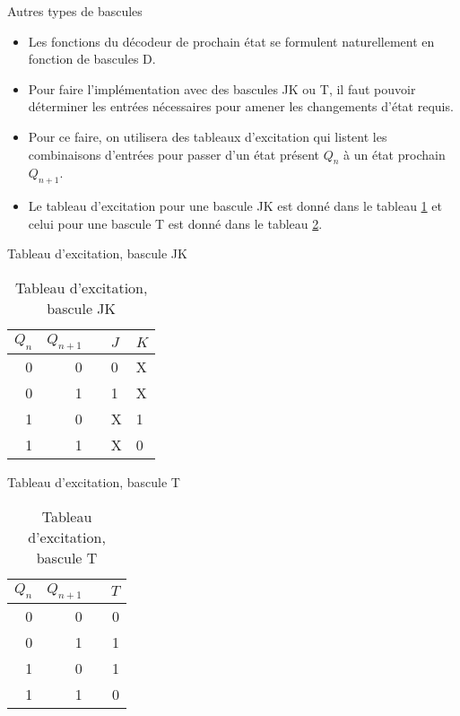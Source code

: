 \documentclass[presentation]{beamer}
\begin{document}
\begin{frame}[label={sec:org92bb3c2}]{Autres types de bascules}
\begin{itemize}
\item Les fonctions du décodeur de prochain état se formulent naturellement en fonction de bascules D.

\item Pour faire l'implémentation avec des bascules JK ou T, il faut pouvoir déterminer les entrées nécessaires pour amener les changements d'état requis.

\item Pour ce faire, on utilisera des \alert{tableaux d'excitation} qui listent les combinaisons d'entrées pour passer d'un état présent \(Q_n\) à un état prochain \(Q_{n+1}\).

\item Le tableau d'excitation pour une bascule JK est donné dans le tableau \ref{tab:orga8d7c8d} et celui pour une bascule T est donné dans le tableau \ref{tab:orgf6159fb}.
\end{itemize}
\end{frame}

\begin{frame}[label={sec:orgcbbd6c3}]{Tableau d'excitation, bascule JK}
\begin{table}[htbp]
\caption{\label{tab:orga8d7c8d}Tableau d'excitation, bascule JK}
\centering
\begin{tabular}{rrlll}
\(Q_n\) & \(Q_{n+1}\) &  & \(J\) & \(K\)\\[0pt]
\hline
0 & 0 &  & 0 & X\\[0pt]
0 & 1 &  & 1 & X\\[0pt]
1 & 0 &  & X & 1\\[0pt]
1 & 1 &  & X & 0\\[0pt]
\end{tabular}
\end{table}
\end{frame}

\begin{frame}[label={sec:orgcb108a9}]{Tableau d'excitation, bascule T}
\begin{table}[htbp]
\caption{\label{tab:orgf6159fb}Tableau d'excitation, bascule T}
\centering
\begin{tabular}{rrlr}
\(Q_n\) & \(Q_{n+1}\) &  & \(T\)\\[0pt]
\hline
0 & 0 &  & 0\\[0pt]
0 & 1 &  & 1\\[0pt]
1 & 0 &  & 1\\[0pt]
1 & 1 &  & 0\\[0pt]
\end{tabular}
\end{table}
\end{frame}
\end{document}
